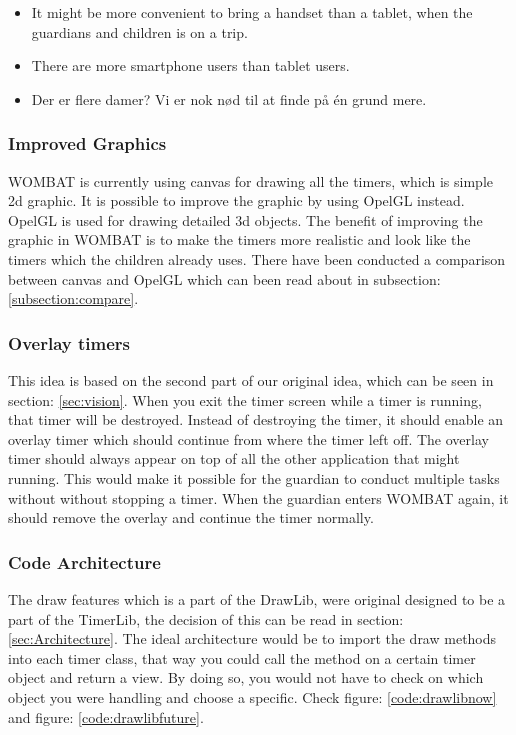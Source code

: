 \begin{itemize}
	\item It might be more convenient to bring a handset than a tablet, when the guardians and children is on a trip.
	\item There are more smartphone users than tablet users. 
	\item Der er flere damer? Vi er nok nød til at finde på én grund mere.
\end{itemize}


\subsubsection{Improved Graphics}
WOMBAT is currently using canvas for drawing all the timers, which is simple 2d graphic. It is possible to improve the graphic by using OpelGL instead. OpelGL is used for drawing detailed 3d objects. The benefit of improving the graphic in WOMBAT is to make the timers more realistic and look like the timers which the children already uses. There have been conducted a comparison between canvas and OpelGL which can been read about in subsection: \ref{subsection:compare}.

\subsubsection{Overlay timers}
This idea is based on the second part of our original idea, which can be seen in section: \ref{sec:vision}.
When you exit the timer screen while a timer is running, that timer will be destroyed. Instead of destroying the timer, it should enable an overlay timer which should continue from where the timer left off. The overlay timer should always appear on top of all the other application that might running. This would make it possible for the guardian to conduct multiple tasks without without stopping a timer. When the guardian enters WOMBAT again, it should remove the overlay and continue the timer normally.

\subsubsection{Code Architecture}
The draw features which is a part of the DrawLib, were original designed to be a part of the TimerLib, the decision of this can be read in section: \ref{sec:Architecture}. 
The ideal architecture would be to import the draw methods into each timer class, that way you could call the method on a certain timer object and return a view. By doing so, you would not have to check on which object you were handling and choose a specific. Check figure: \ref{code:drawlibnow} and figure: \ref{code:drawlibfuture}.


